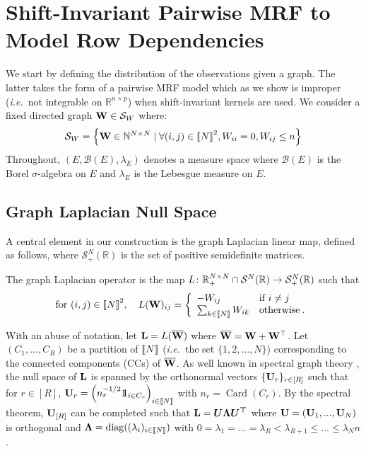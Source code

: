 \section {Shift-Invariant Pairwise MRF to Model Row Dependencies} \label{sec:graph_structure}

We start by defining the distribution of the observations given a graph. The latter takes the form of a pairwise MRF model which as we show is improper (\textit{i.e.}\ not integrable on $\mathbb{R}^{n \times p}$) when shift-invariant kernels are used. We consider a fixed directed graph ${\mathbf{W}} \in \mathcal{S}_{W}$ where:
$$\mathcal{S}_{W} = \left\{{\mathbf{W}} \in \mathbb{N}^{N \times N} \mid \forall (i,j) \in {[\![N]\!]}^2, W_{ii}=0, W_{ij} \leq n \right\}$$
Throughout, $(E, \mathcal{B}(E), \lambda_E)$ denotes a measure space where $\mathcal{B}(E)$ is the Borel $\sigma$-algebra on $E$ and $\lambda_E$ is the Lebesgue measure on $E$.

\subsection{Graph Laplacian Null Space}\label{sec:laplacian_prop}
A central element in our construction is the graph Laplacian linear map, defined as follows, where $\mathcal{S}^N_+(\mathbb{R})$ is the set of positive semidefinite matrices.
\begin{definition}\label{graph_laplacian}
The graph Laplacian operator is the map $L \colon \mathbb{R}_+^{N \times N} \cap \mathcal{S}^N(\mathbb{R}) \to \mathcal{S}^N_+(\mathbb{R})$ such that
$$\text{for } (i,j) \in {[\![N]\!]}^2, \quad L({\mathbf{W}})_{ij} = \left\{
\begin{array}{ll}
    - W_{ij} & \text{if } i \neq j \\
    \sum_{k \in {[\![N]\!]}} W_{ik} & \text{otherwise} \:.
\end{array} 
\right. $$
\end{definition}
With an abuse of notation, let $\mathbf{L} = L(\overline{{\mathbf{W}}})$ where $\overline{{\mathbf{W}}} = {\mathbf{W}} + {\mathbf{W}}^\top$. Let $(C_1,...,C_{R})$ be a partition of ${[\![N]\!]}$ (\textit{i.e.}\ the set $\{1,2,...,N\}$) corresponding to the connected components (CCs) of $\overline{{\mathbf{W}}}$. As well known in spectral graph theory \citep{Chung97}, the null space of $\mathbf{L}$ is spanned by the orthonormal vectors $\{\mathbf{U}_{r}\}_{r \in [R]}$ such that for $r \in [R]$,
$\mathbf{U}_{r} = \left(n_r^{-1/2} 1\!\!1_{i \in C_r}\right)_{i \in {[\![N]\!]}}$ with $n_r = \operatorname{Card}(C_r)$. By the spectral theorem, $\mathbf{U}_{[R]}$ can be completed such that $\mathbf{L} = \bm{U \Lambda U^\top}$ where $\mathbf{U} = (\mathbf{U}_1, ..., \mathbf{U}_N)$ is orthogonal and $\bm{\Lambda} = \operatorname{diag}((\lambda_i)_{i \in {[\![N]\!]}})$ with $0 = \lambda_1 = ... = \lambda_R < \lambda_{R+1} \leq ... \leq \lambda_Nn$. 

